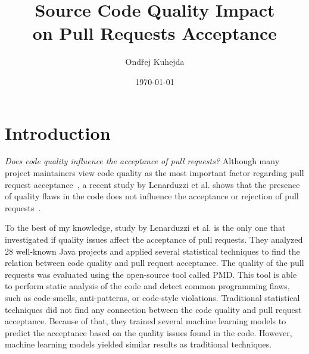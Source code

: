 \documentclass[digital,oneside,oldtable,nolof,nolot,nocover]{fithesis4}
\author{Ondřej Kuhejda}
\date{\today}
\title{Source Code Quality Impact \\ on Pull Requests Acceptance}
\begin{document}
\chapter{Introduction}
\label{sec:orge456693}
\emph{Does code quality influence the acceptance of pull requests?} Although many
project maintainers view code quality as the most important factor regarding
pull request acceptance~\cite{integrator}, a recent study by Lenarduzzi et al.
shows that the presence of quality flaws in the code does not influence the
acceptance or rejection of pull requests~\cite{quality}.

To the best of my knowledge, study by Lenarduzzi et al. is the only one that
investigated if quality issues affect the acceptance of pull requests. They
analyzed 28 well-known Java projects and applied several statistical
techniques to find the relation between code quality and pull request
acceptance. The quality of the pull requests was evaluated using the
open-source tool called PMD. This tool is able to perform static analysis of
the code and detect common programming flaws, such as code-smells,
anti-patterns, or code-style violations. Traditional statistical techniques
did not find any connection between the code quality and pull request
acceptance. Because of that, they trained several machine learning models to
predict the acceptance based on the quality issues found in the code. However,
machine learning models yielded similar results as traditional techniques.
\end{document}

